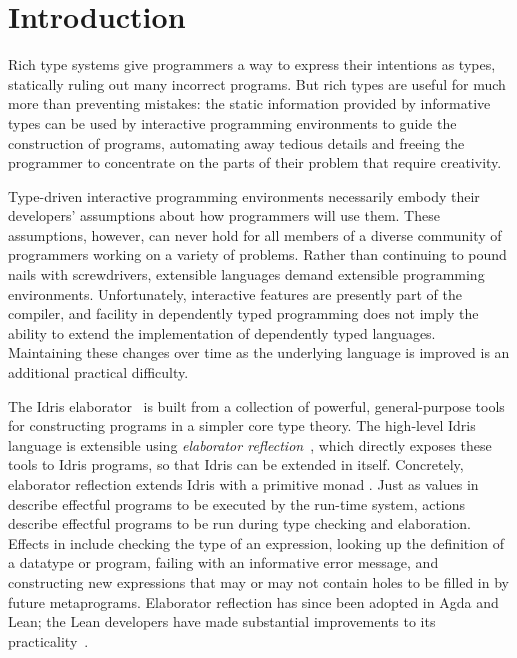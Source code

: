 \section{Introduction} \label{chap:introduction}


Rich type systems give programmers a way to express their intentions
as types, statically ruling out many incorrect programs. But rich
types are useful for much more than preventing mistakes: the static
information provided by informative types can be used by interactive
programming environments to guide the construction of programs,
automating away tedious details and freeing the programmer to
concentrate on the parts of their problem that require creativity.

Type-driven interactive programming environments necessarily embody
their developers' assumptions about how programmers will use
them. These assumptions, however, can never hold for all members of a
diverse community of programmers working on a variety of
problems. Rather than continuing to pound nails with screwdrivers,
extensible languages demand extensible programming environments.
Unfortunately, interactive features are presently part of the
compiler, and facility in dependently typed programming does not imply
the ability to extend the implementation of dependently typed
languages. Maintaining these changes over time as the underlying
language is improved is an additional practical difficulty.

The Idris elaborator~\citep{idris} is built from a collection of
powerful, general-purpose tools for constructing programs in a simpler
core type theory. The high-level Idris language is extensible using
\emph{elaborator reflection}~\citep{davidphd, elabref}, which directly
exposes these tools to Idris programs, so that Idris can be extended
in itself. Concretely, elaborator reflection extends Idris with a
primitive monad \Elab{}. Just as values in \IO{} describe effectful
programs to be executed by the run-time system, \Elab{} actions
describe effectful programs to be run during type checking and
elaboration. Effects in \Elab{} include checking the type of an
expression, looking up the definition of a datatype or program,
failing with an informative error message, and constructing new
expressions that may or may not contain holes to be filled in by
future metaprograms. Elaborator reflection has since been adopted in
Agda and Lean; the Lean developers have made substantial improvements
to its practicality~\citep{leanmeta}.


